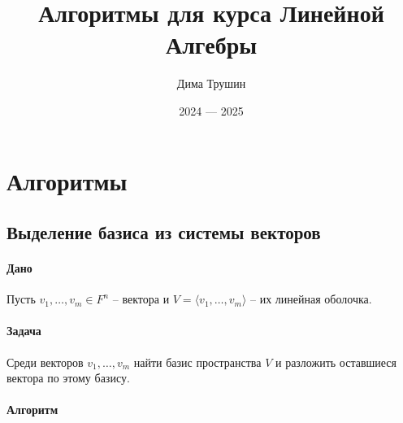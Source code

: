 \documentclass{article}
\begin{document}
\title{Алгоритмы для курса Линейной Алгебры}
\author{Дима Трушин}
\date{2024 --- 2025}
	
\maketitle

\tableofcontents

\section*{Алгоритмы}

\subsection{Выделение базиса из системы векторов}

\paragraph{Дано}

Пусть $v_1,\ldots,v_m\in F^n$ -- вектора и $V = \langle v_1,\ldots,v_m\rangle$ -- их линейная оболочка.

\paragraph{Задача}

Среди векторов $v_1,\ldots,v_m$ найти базис пространства $V$ и разложить оставшиеся вектора по этому базису.

\paragraph{Алгоритм}
\end{document}
